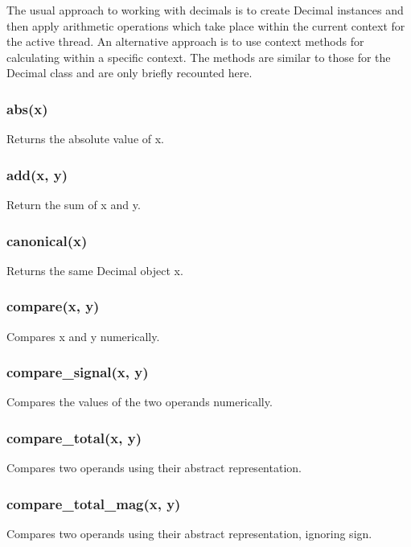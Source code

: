\vpara
The usual approach to working with decimals is to create Decimal instances and then apply arithmetic operations which take place within the current context for the active thread. An alternative approach is to use context methods for calculating within a specific context. The methods are similar to those for the Decimal class and are only briefly recounted here.

\subsubsection{abs(x)}

Returns the absolute value of x.

\subsubsection{add(x, y)}

Return the sum of x and y.

\subsubsection{canonical(x)}

Returns the same Decimal object x.

\subsubsection{compare(x, y)}

Compares x and y numerically.

\subsubsection{compare\_signal(x, y)}

Compares the values of the two operands numerically.

\subsubsection{compare\_total(x, y)}

Compares two operands using their abstract representation.

\subsubsection{compare\_total\_mag(x, y)}

Compares two operands using their abstract representation, ignoring sign.

